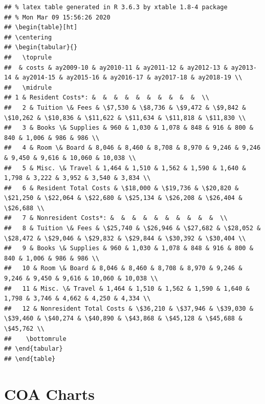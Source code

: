 \documentclass[
]{book}
\begin{document}
\begin{verbatim}
## % latex table generated in R 3.6.3 by xtable 1.8-4 package
## % Mon Mar 09 15:56:26 2020
## \begin{table}[ht]
## \centering
## \begin{tabular}{}
##   \toprule
##  & costs & ay2009-10 & ay2010-11 & ay2011-12 & ay2012-13 & ay2013-14 & ay2014-15 & ay2015-16 & ay2016-17 & ay2017-18 & ay2018-19 \\ 
##   \midrule
## 1 & Resident Costs*: &  &  &  &  &  &  &  &  &  &  \\ 
##   2 & Tuition \& Fees & \$7,530 & \$8,736 & \$9,472 & \$9,842 & \$10,262 & \$10,836 & \$11,622 & \$11,634 & \$11,818 & \$11,830 \\ 
##   3 & Books \& Supplies & 960 & 1,030 & 1,078 & 848 & 916 & 800 & 840 & 1,006 & 986 & 986 \\ 
##   4 & Room \& Board & 8,046 & 8,460 & 8,708 & 8,970 & 9,246 & 9,246 & 9,450 & 9,616 & 10,060 & 10,038 \\ 
##   5 & Misc. \& Travel & 1,464 & 1,510 & 1,562 & 1,590 & 1,640 & 1,798 & 3,222 & 3,952 & 3,540 & 3,834 \\ 
##   6 & Resident Total Costs & \$18,000 & \$19,736 & \$20,820 & \$21,250 & \$22,064 & \$22,680 & \$25,134 & \$26,208 & \$26,404 & \$26,688 \\ 
##   7 & Nonresident Costs*: &  &  &  &  &  &  &  &  &  &  \\ 
##   8 & Tuition \& Fees & \$25,740 & \$26,946 & \$27,682 & \$28,052 & \$28,472 & \$29,046 & \$29,832 & \$29,844 & \$30,392 & \$30,404 \\ 
##   9 & Books \& Supplies & 960 & 1,030 & 1,078 & 848 & 916 & 800 & 840 & 1,006 & 986 & 986 \\ 
##   10 & Room \& Board & 8,046 & 8,460 & 8,708 & 8,970 & 9,246 & 9,246 & 9,450 & 9,616 & 10,060 & 10,038 \\ 
##   11 & Misc. \& Travel & 1,464 & 1,510 & 1,562 & 1,590 & 1,640 & 1,798 & 3,746 & 4,662 & 4,250 & 4,334 \\ 
##   12 & Nonresident Total Costs & \$36,210 & \$37,946 & \$39,030 & \$39,460 & \$40,274 & \$40,890 & \$43,868 & \$45,128 & \$45,688 & \$45,762 \\ 
##    \bottomrule
## \end{tabular}
## \end{table}
\end{verbatim}

\hypertarget{coa-charts}{%
\section{COA Charts}\label{coa-charts}}
\end{document}
